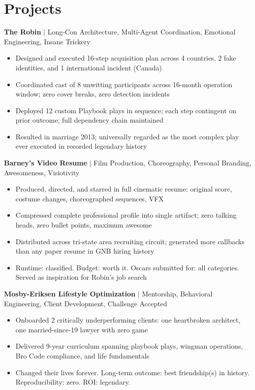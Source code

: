 \documentclass[letterpaper,10.5pt]{article}
\begin{document}
\section*{Projects}
\textbf{The Robin} $|$ Long-Con Architecture, Multi-Agent Coordination, Emotional Engineering, Insane Trickery
\begin{itemize}
  \item Designed and executed 16-step acquisition plan across 4 countries, 2 fake identities, and 1 international incident (Canada)
  \item Coordinated cast of 8 unwitting participants across 16-month operation window; zero cover breaks, zero detection incidents
  \item Deployed 12 custom Playbook plays in sequence; each step contingent on prior outcome; full dependency chain maintained
  \item Resulted in marriage 2013; universally regarded as the most complex play ever executed in recorded legendary history
\end{itemize}
\vspace{1pt}
\textbf{Barney's Video Resume} $|$ Film Production, Choreography, Personal Branding, Awesomeness, Visiotivity
\begin{itemize}
  \item Produced, directed, and starred in full cinematic resume: original score, costume changes, choreographed sequences, VFX
  \item Compressed complete professional profile into single artifact; zero talking heads, zero bullet points, maximum awesome
  \item Distributed across tri-state area recruiting circuit; generated more callbacks than any paper resume in GNB hiring history
  \item Runtime: classified. Budget: worth it. Oscars submitted for: all categories. Served as inspiration for Robin's job search
\end{itemize}
\vspace{1pt}
\textbf{Mosby-Eriksen Lifestyle Optimization} $|$ Mentorship, Behavioral Engineering, Client Development, Challenge Accepted
\begin{itemize}
  \item Onboarded 2 critically underperforming clients: one heartbroken architect, one married-since-19 lawyer with zero game
  \item Delivered 9-year curriculum spanning playbook plays, wingman operations, Bro Code compliance, and life fundamentals
  \item Changed their lives forever. Long-term outcome: best friendship(s) in history. Reproducibility: zero. ROI: legendary.
\end{itemize}
\end{document}
